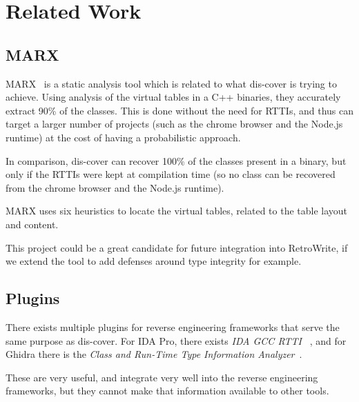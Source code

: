 \documentclass[a4paper,11pt,oneside]{report}
\begin{document}
\chapter{Related Work}




\section{MARX}
\label{relatedworksmarx}

MARX~\cite{marx} is a static analysis tool which is related to what dis-cover
is trying to achieve. Using analysis of the virtual tables in a C++ binaries,
they accurately extract 90\% of the classes. This is done without the need for
RTTIs, and thus can target a larger number of projects (such as the chrome
browser and the Node.js runtime) at the cost of having a probabilistic
approach.

In comparison, dis-cover can recover 100\% of the classes present in a binary,
but only if the RTTIs were kept at compilation time (so no class can be
recovered from the chrome browser and the Node.js runtime).

MARX uses six heuristics to locate the virtual tables, related to the table
layout and content.

This project could be a great candidate for future integration into
RetroWrite, if we extend the tool to add defenses around type integrity for
example.


\section{Plugins}

There exists multiple plugins for reverse engineering frameworks that serve
the same purpose as dis-cover. For IDA Pro, there exists \emph{IDA GCC RTTI}
~\cite{idagccrtti}, and for Ghidra there is the \emph{Class and Run-Time
Type Information Analyzer}~\cite{ghidracppclassanalyzer}.

These are very useful, and integrate very well into the reverse engineering
frameworks, but they cannot make that information available to other tools.
\end{document}
